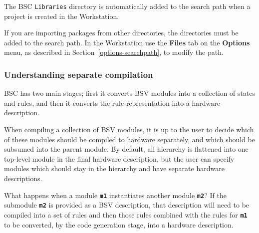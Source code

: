 \documentclass{article}
\newcommand{\te}[1]{\texttt{#1}}
\newenvironment{centerboxverbatim}
  {\center
   \boxedverbatim}
  {\endboxedverbatim
  {\endcenter }}
\begin{document}
\begin{centerboxverbatim}
\end{centerboxverbatim}
The BSC \te{Libraries} directory is automatically
added to the search path  when a project is created in  the Workstation.

If you are importing packages from other directories, the
directories must be added to the search path.  In the Workstation
use the {\bf Files} tab on the {\bf Options} menu, as described in
Section~\ref{options-searchpath}, to modify the path.



\subsubsection{Understanding separate compilation}
\label{sep-compile}

BSC has two main stages; first it converts BSV modules
into a collection of states and rules, and then it converts the
rule-representation into a hardware description.

When compiling a collection of BSV modules, it is up to the user to
decide which of these modules should be compiled to hardware
separately, and which should be subsumed into the parent module.  By
default, all hierarchy is flattened into one top-level module in the
final hardware description, but the user can specify   modules which should
stay in the hierarchy and
have separate hardware descriptions.

 What happens when
a module {\bf\tt m1} instantiates another module {\bf\tt m2}?
If the submodule {\bf\tt m2} is provided as a BSV
description, that description will need to be compiled into a set of
rules and then those rules combined with the rules for {\bf\tt m1} to
be converted, by the code generation stage, into a  hardware
description.
\end{document}
